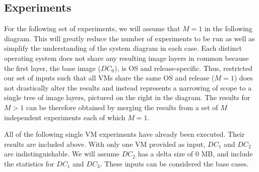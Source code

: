 \subsection{Experiments}
For the following set of experiments, we will assume that $M=1$ in the following diagram. This will greatly reduce the number of experiments to be run as well as simplify the understanding of the system diagram in each case. Each distinct operating system does not share any resulting image layers in common because the first layer, the base image ($DC_0$), is OS and release-specific. Thus, restricted our set of inputs such that all VMs share the same OS and release ($M=1$) does not drastically alter the results and instead represents a narrowing of scope to a single tree of image layers, pictured on the right in the diagram. The results for $M>1$ can be therefore obtained by merging the results from a set of $M$ independent experiments each of which $M=1$.

All of the following single VM experiments have already been executed. Their results are included above. With only one VM provided as input, $DC_1$ and $DC_2$ are indistinguishable. We will assume $DC_2$ has a delta size of 0 MB, and include the statistics for $DC_1$ and $DC_3$. These inputs can be considered the base cases.


